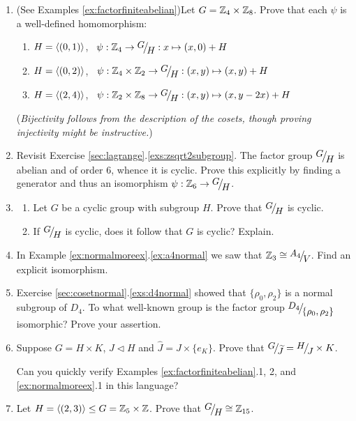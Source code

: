 \begin{exercises}
\begin{enumerate}
	
	 	\item (See Examples \ref{ex:factorfiniteabelian})\lstsp Let $G=\mathbb{Z}_4\times\mathbb{Z}_8$. Prove that each $\psi$ is a well-defined homomorphism:
		\begin{enumerate}\itemsep0pt
			\item $H=\left\langle (0,1)\right\rangle$, \ $\psi:\Z_4\to\quotient GH:x\mapsto (x,0)+H$
			\item $H=\left\langle (0,2)\right\rangle$, \ $\psi:\Z_4\times\Z_2\to\quotient GH:(x,y)\mapsto (x,y)+H$
			\item $H=\left\langle (2,4)\right\rangle$, \ $\psi:\Z_2\times\Z_8\to\quotient GH:(x,y)\mapsto (x,y-2x)+H$
		\end{enumerate}
		(\emph{Bijectivity follows from the description of the cosets, though proving injectivity might be instructive.})
		
		
		\item Revisit Exercise \ref*{sec:lagrange}.\ref{exs:zsqrt2subgroup}. The factor group $\quotient GH$ is abelian and of order 6, whence it is cyclic. Prove this explicitly by finding a generator and thus an isomorphism $\psi:\Z_6\to\quotient GH$.
		
		
		\item\begin{enumerate}
	  	\item Let $G$ be a cyclic group with subgroup $H$. Prove that $\quotient GH$ is cyclic.
	  	\item If $\quotient GH$ is cyclic, does it follow that $G$ is cyclic? Explain.
		\end{enumerate}
	
	
		\item In Example \ref*{ex:normalmoreex}.\ref{ex:a4normal} we saw that $\Z_3\cong\quotient{A_4}{V}$. Find an explicit isomorphism.
	
	
		\item Exercise \ref*{sec:cosetnormal}.\ref{exs:d4normal} showed that $\{\rho_0,\rho_2\}$ is a normal subgroup of $D_4$. To what well-known group is the factor group $\quotient{D_4}{\{\rho_0,\rho_2\}}$ isomorphic? Prove your assertion.
		
		
		\item\label{exs:normaldirectfactor} Suppose $G=H\times K$, $J\triangleleft H$ and $\widehat J=J\times\{e_K\}$. Prove that $\quotient G{\widetilde J}=\quotient HJ\times K$.\par
		Can you quickly verify Examples \ref{ex:factorfiniteabelian}.1, 2, and \ref{ex:normalmoreex}.1 in this language?
		
		
		\item Let $H=\left\langle (2,3)\right\rangle\le G=\mathbb{Z}_5\times \mathbb{Z}$. Prove that $\quotient GH\cong \Z_{15}$.
		

\end{enumerate}
\end{exercises}
